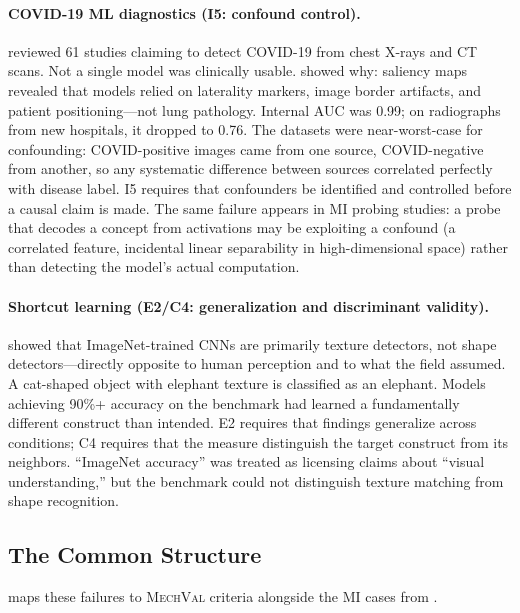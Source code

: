 \documentclass{article}
\newcommand{\mechval}{\textsc{MechVal}}
\begin{document}
\paragraph{COVID-19 ML diagnostics (I5: confound control).}
\citet{roberts2021common} reviewed 61 studies claiming to detect COVID-19 from chest X-rays and CT scans. Not a single model was clinically usable. \citet{degrave2021ai} showed why: saliency maps revealed that models relied on laterality markers, image border artifacts, and patient positioning---not lung pathology. Internal AUC was 0.99; on radiographs from new hospitals, it dropped to 0.76. The datasets were near-worst-case for confounding: COVID-positive images came from one source, COVID-negative from another, so any systematic difference between sources correlated perfectly with disease label. I5 requires that confounders be identified and controlled before a causal claim is made. The same failure appears in MI probing studies: a probe that decodes a concept from activations may be exploiting a confound (a correlated feature, incidental linear separability in high-dimensional space) rather than detecting the model's actual computation.

\paragraph{Shortcut learning (E2/C4: generalization and discriminant validity).}
\citet{geirhos2019imagenet} showed that ImageNet-trained CNNs are primarily texture detectors, not shape detectors---directly opposite to human perception and to what the field assumed. A cat-shaped object with elephant texture is classified as an elephant. Models achieving 90\%+ accuracy on the benchmark had learned a fundamentally different construct than intended. E2 requires that findings generalize across conditions; C4 requires that the measure distinguish the target construct from its neighbors. ``ImageNet accuracy'' was treated as licensing claims about ``visual understanding,'' but the benchmark could not distinguish texture matching from shape recognition.

\subsection{The Common Structure}

 maps these failures to \mechval{} criteria alongside the MI cases from .
\end{document}
